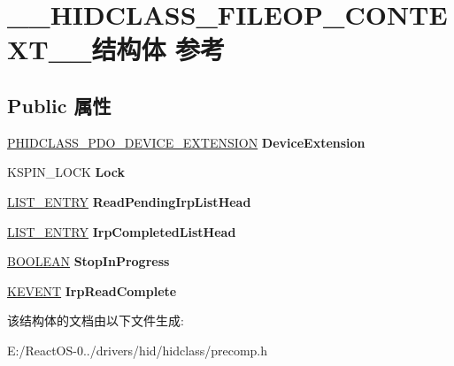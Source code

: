 \hypertarget{struct_____h_i_d_c_l_a_s_s___f_i_l_e_o_p___c_o_n_t_e_x_t____}{}\section{\+\_\+\+\_\+\+H\+I\+D\+C\+L\+A\+S\+S\+\_\+\+F\+I\+L\+E\+O\+P\+\_\+\+C\+O\+N\+T\+E\+X\+T\+\_\+\+\_\+结构体 参考}
\label{struct_____h_i_d_c_l_a_s_s___f_i_l_e_o_p___c_o_n_t_e_x_t____}
\subsection*{Public 属性}
\begin{DoxyCompactItemize}
\item 
\mbox{\label{struct_____h_i_d_c_l_a_s_s___f_i_l_e_o_p___c_o_n_t_e_x_t_____adc86aadff772473e73ef5d2a8aa6dae3}} 
\hyperlink{struct_h_i_d_c_l_a_s_s___p_d_o___d_e_v_i_c_e___e_x_t_e_n_s_i_o_n}{P\+H\+I\+D\+C\+L\+A\+S\+S\+\_\+\+P\+D\+O\+\_\+\+D\+E\+V\+I\+C\+E\+\_\+\+E\+X\+T\+E\+N\+S\+I\+ON} {\bfseries Device\+Extension}
\item 
\mbox{\label{struct_____h_i_d_c_l_a_s_s___f_i_l_e_o_p___c_o_n_t_e_x_t_____ad359128cdff5b608b79e48fba85d577e}} 
K\+S\+P\+I\+N\+\_\+\+L\+O\+CK {\bfseries Lock}
\item 
\mbox{\label{struct_____h_i_d_c_l_a_s_s___f_i_l_e_o_p___c_o_n_t_e_x_t_____a5af25372054e30640d8ba46564299d17}} 
\hyperlink{struct___l_i_s_t___e_n_t_r_y}{L\+I\+S\+T\+\_\+\+E\+N\+T\+RY} {\bfseries Read\+Pending\+Irp\+List\+Head}
\item 
\mbox{\label{struct_____h_i_d_c_l_a_s_s___f_i_l_e_o_p___c_o_n_t_e_x_t_____a5febfa24c4fd25067b64b755c4dfc5f1}} 
\hyperlink{struct___l_i_s_t___e_n_t_r_y}{L\+I\+S\+T\+\_\+\+E\+N\+T\+RY} {\bfseries Irp\+Completed\+List\+Head}
\item 
\mbox{\label{struct_____h_i_d_c_l_a_s_s___f_i_l_e_o_p___c_o_n_t_e_x_t_____aa42428bf1aa6c214695ca9a29cff1be8}} 
\hyperlink{_processor_bind_8h_a112e3146cb38b6ee95e64d85842e380a}{B\+O\+O\+L\+E\+AN} {\bfseries Stop\+In\+Progress}
\item 
\mbox{\label{struct_____h_i_d_c_l_a_s_s___f_i_l_e_o_p___c_o_n_t_e_x_t_____a16ee2ce501d9409136fbd208470705f7}} 
\hyperlink{struct___k_e_v_e_n_t}{K\+E\+V\+E\+NT} {\bfseries Irp\+Read\+Complete}
\end{DoxyCompactItemize}


该结构体的文档由以下文件生成\+:\begin{DoxyCompactItemize}
\item 
E\+:/\+React\+O\+S-\/0../drivers/hid/hidclass/precomp.\+h\end{DoxyCompactItemize}
